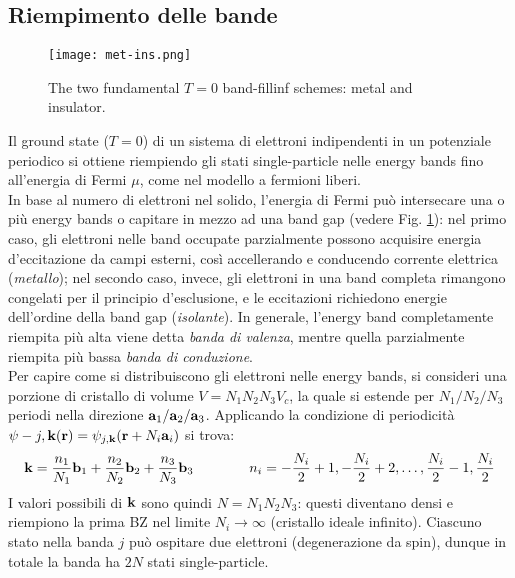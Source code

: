 \subsection{Riempimento delle bande}

\begin{figure}
	\centering
	\texttt{[image: met-ins.png]}
	\caption{The two fundamental $ T = 0 $ band-fillinf schemes: metal and insulator.}
	\label{met-ins}
\end{figure}

Il ground state ($ T = 0 $) di un sistema di elettroni indipendenti in un potenziale periodico si ottiene riempiendo gli stati single-particle nelle energy bands fino all'energia di Fermi $ \mu $, come nel modello a fermioni liberi. \\
In base al numero di elettroni nel solido, l'energia di Fermi può intersecare una o più energy bands o capitare in mezzo ad una band gap (vedere Fig. \ref{met-ins}): nel primo caso, gli elettroni nelle band occupate parzialmente possono acquisire energia d'eccitazione da campi esterni, così accellerando e conducendo corrente elettrica (\textit{metallo}); nel secondo caso, invece, gli elettroni in una band completa rimangono congelati per il principio d'esclusione, e le eccitazioni richiedono energie dell'ordine della band gap (\textit{isolante}). In generale, l'energy band completamente riempita più alta viene detta \textit{banda di valenza}, mentre quella parzialmente riempita più bassa \textit{banda di conduzione}. \\
Per capire come si distribuiscono gli elettroni nelle energy bands, si consideri una porzione di cristallo di volume $ V = N_1 N_2 N_3 V_c $, la quale si estende per $ N_1 / N_2 / N_3 $ periodi nella direzione $ \mathbf{a}_1 / \mathbf{a}_2 / \mathbf{a}_3 $. Applicando la condizione di periodicità $ \psi-{j,\mathbf{k}}(\mathbf{r}) = \psi_{j,\mathbf{k}}(\mathbf{r} + N_i \mathbf{a}_i) $ si trova:
\begin{equation}
	\mathbf{k} = \frac{n_1}{N_1} \mathbf{b}_1 + \frac{n_2}{N_2} \mathbf{b}_2 + \frac{n_3}{N_3} \mathbf{b}_3
	\qquad \qquad
	n_i = - \frac{N_i}{2} + 1 , - \frac{N_i}{2} + 2 , \dots , \frac{N_i}{2} -1 , \frac{N_i}{2}
	\label{eq:n-k}
\end{equation}
I valori possibili di $ \mathbf{k} $ sono quindi $ N = N_1 N_2 N_3 $: questi diventano densi e riempiono la prima BZ nel limite $ N_i \rightarrow \infty $ (cristallo ideale infinito). Ciascuno stato nella banda $ j $ può ospitare due elettroni (degenerazione da spin), dunque in totale la banda ha $ 2N $ stati single-particle.

